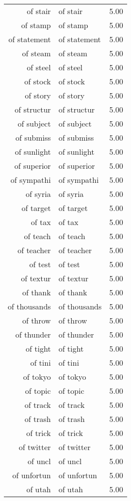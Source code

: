 \begin{table}[ht]
\begin{tabular}{rlr}
  of stair & of stair & 5.00 \\ 
  of stamp & of stamp & 5.00 \\ 
  of statement & of statement & 5.00 \\ 
  of steam & of steam & 5.00 \\ 
  of steel & of steel & 5.00 \\ 
  of stock & of stock & 5.00 \\ 
  of story & of story & 5.00 \\ 
  of structur & of structur & 5.00 \\ 
  of subject & of subject & 5.00 \\ 
  of submiss & of submiss & 5.00 \\ 
  of sunlight & of sunlight & 5.00 \\ 
  of superior & of superior & 5.00 \\ 
  of sympathi & of sympathi & 5.00 \\ 
  of syria & of syria & 5.00 \\ 
  of target & of target & 5.00 \\ 
  of tax & of tax & 5.00 \\ 
  of teach & of teach & 5.00 \\ 
  of teacher & of teacher & 5.00 \\ 
  of test & of test & 5.00 \\ 
  of textur & of textur & 5.00 \\ 
  of thank & of thank & 5.00 \\ 
  of thousands & of thousands & 5.00 \\ 
  of throw & of throw & 5.00 \\ 
  of thunder & of thunder & 5.00 \\ 
  of tight & of tight & 5.00 \\ 
  of tini & of tini & 5.00 \\ 
  of tokyo & of tokyo & 5.00 \\ 
  of topic & of topic & 5.00 \\ 
  of track & of track & 5.00 \\ 
  of trash & of trash & 5.00 \\ 
  of trick & of trick & 5.00 \\ 
  of twitter & of twitter & 5.00 \\ 
  of uncl & of uncl & 5.00 \\ 
  of unfortun & of unfortun & 5.00 \\ 
  of utah & of utah & 5.00 \\ 

\end{tabular}
\end{table}
